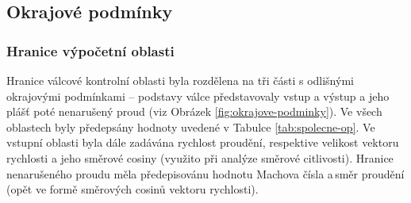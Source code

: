             
     \newpage      
    \subsection{Okrajové podmínky}
        \subsubsection{Hranice výpočetní oblasti}
			Hranice válcové kontrolní oblasti byla rozdělena na tři části s odlišnými okrajovými podmínkami – podstavy válce představovaly vstup a výstup a jeho plášť poté nenarušený proud (viz Obrázek \ref{fig:okrajove-podminky}). Ve všech oblastech byly předepsány hodnoty uvedené v Tabulce \ref{tab:spolecne-op}. Ve vstupní oblasti byla dále zadávána rychlost proudění, respektive velikost vektoru rychlosti a jeho směrové cosiny (využito při analýze směrové citlivosti). Hranice nenarušeného proudu měla předepisovánu hodnotu Machova čísla a\,směr proudění (opět ve formě směrových cosinů vektoru rychlosti). 

